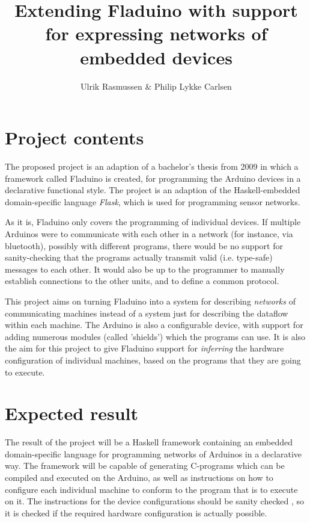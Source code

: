 \documentclass[a4paper, 11pt, oneside, report]{memoir}
\title{Extending Fladuino with support for expressing networks of embedded
devices}
\author{Ulrik Rasmussen \& Philip Lykke Carlsen}
\begin{document}
\maketitle

\section*{Project contents}

The proposed project is an adaption of a bachelor's thesis from
2009\cite{fladuino} in which a framework called Fladuino is created, for
programming the Arduino devices in a declarative functional style. The project
is an adaption of the Haskell-embedded domain-specific language \emph{Flask},
which is used for programming sensor networks.


As it is, Fladuino only covers the programming of individual devices. If
multiple Arduinos were to communicate with each other in a network (for
instance, via bluetooth), possibly with different programs, there would be no
support for sanity-checking that the programs actually transmit valid (i.e.
type-safe) messages to each other. It would also be up to the programmer to
manually establish connections to the other units, and to define a common
protocol.

This project aims on turning Fladuino into a system for describing
\emph{networks} of communicating machines instead of a system just for
describing the dataflow within each machine. The Arduino is also a configurable
device, with support for adding numerous modules (called 'shields') which the
programs can use. It is also the aim for this project to give Fladuino support
for \emph{inferring} the hardware configuration of individual machines, based
on the programs that they are going to execute.


\section*{Expected result}

The result of the project will be a Haskell framework containing an embedded
domain-specific language for programming networks of Arduinos in a declarative
way. The framework will be capable of generating C-programs which can be
compiled and executed on the Arduino, as well as instructions on how to
configure each individual machine to conform to the program that is to execute
on it. The instructions for the device configurations should be sanity checked
, so it is checked if the required hardware configuration is actually possible.
\end{document}
